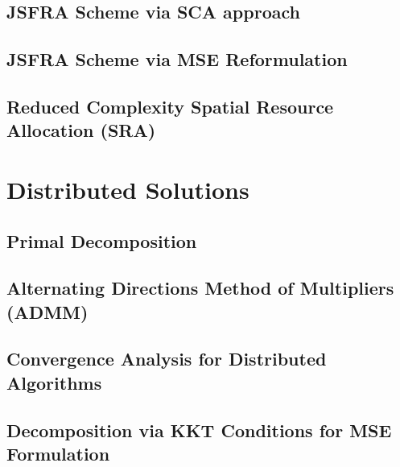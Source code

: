 \documentclass[10pt,journal,twocolumn,letterpaper]{./../Styles/IEEEtran}
\begin{document}
\subsection{\acs{JSFRA} Scheme via \ac{SCA} approach} \label{sec-3.2.1}



\subsection{\ac{JSFRA} Scheme via \ac{MSE} Reformulation} \label{sec-3.3}


\subsection{Reduced Complexity Spatial Resource Allocation (\acs{SRA})} \label{sec-3.4}
\review{}

\section{Distributed Solutions} \label{sec-4}

\review{}


\subsection{Primal Decomposition} \label{sec-4.1}

%

\subsection{Alternating Directions Method of Multipliers (ADMM)} \label{sec-4.2}

%

\subsection{Convergence Analysis for Distributed Algorithms} \label{sec-dist-conv}
\review{}

\subsection{Decomposition via \ac{KKT} Conditions for \ac{MSE} Formulation} \label{sec-4.3}

\end{document}
